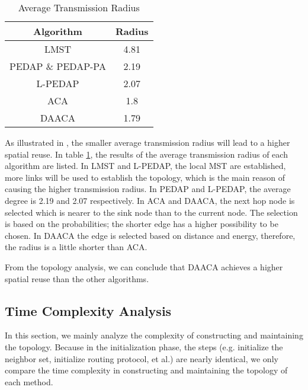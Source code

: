 \documentclass{elsarticle}
\begin{document}
\begin{table}[!hbp]
\centering
\caption{Average Transmission Radius} \label{AverageTransmissionRadius}
\begin{tabular}{cc}
\toprule
\textbf{Algorithm} & \textbf{Radius} \\
\midrule
LMST & 4.81 \\
PEDAP \& PEDAP-PA & 2.19 \\
L-PEDAP & 2.07 \\
ACA & 1.8 \\
DAACA & 1.79 \\
\bottomrule
\end{tabular}

\end{table}
As illustrated in \cite{label-7}, the smaller average transmission radius will lead to a higher spatial reuse. In table \ref{AverageTransmissionRadius}, the results of the average transmission radius of each algorithm are listed. In LMST and L-PEDAP, the local MST are established, more links will be used to establish the topology, which is the main reason of causing the higher transmission radius. In PEDAP and L-PEDAP, the average degree is 2.19 and 2.07 respectively. In ACA and DAACA, the next hop node is selected which is nearer to the sink node than to the current node. The selection is based on the probabilities; the shorter edge has a higher possibility to be chosen. In DAACA the edge is selected based on distance and energy, therefore, the radius is a little shorter than ACA.

From the topology analysis, we can conclude that DAACA achieves a higher spatial reuse than the other algorithms.



\subsection{Time Complexity Analysis}
In this section, we mainly analyze the complexity of constructing and maintaining the topology. Because in the initialization phase, the steps (e.g. initialize the neighbor set, initialize routing protocol, et al.) are nearly identical, we only compare the time complexity in constructing and maintaining the topology of each method.
\end{document}

